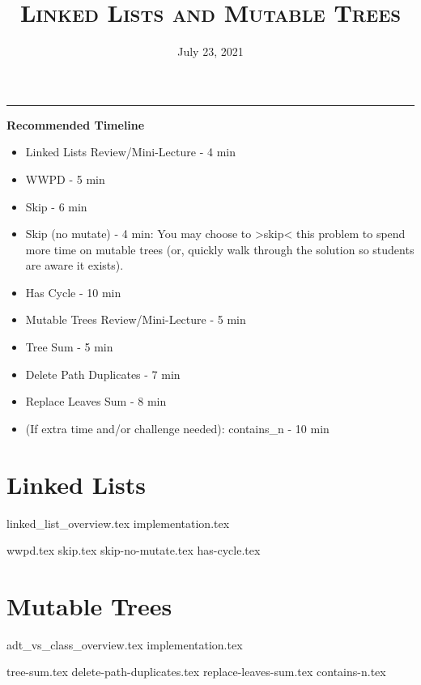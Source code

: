 \documentclass{exam}
\title{\textsc{Linked Lists and Mutable Trees}}
\date{July 23, 2021}
\begin{document}
\maketitle
\rule{\textwidth}{0.15em}
\fontsize{12}{15}\selectfont

\begin{guide}
\textbf{Recommended Timeline}
\begin{itemize}
    \item Linked Lists Review/Mini-Lecture - 4 min
    \item WWPD - 5 min
    \item Skip - 6 min
    \item Skip (no mutate) - 4 min: You may choose to >skip< this problem to spend more time on mutable trees (or, quickly walk through the solution so students are aware it exists).
    \item Has Cycle - 10 min
    \item Mutable Trees Review/Mini-Lecture - 5 min
    \item Tree Sum - 5 min
    \item Delete Path Duplicates - 7 min
    \item Replace Leaves Sum - 8 min
    \item (If extra time and/or challenge needed): contains\_n - 10 min
\end{itemize}
\end{guide}

\section{Linked Lists}
{linked_list_overview.tex}
{implementation.tex}
\newpage
\begin{questions}
{wwpd.tex}
\newpage
{skip.tex}
{skip-no-mutate.tex}
{has-cycle.tex}
\end{questions}

\newpage
\section{Mutable Trees}
{adt_vs_class_overview.tex}
{implementation.tex}
\begin{questions}
    {tree-sum.tex}
    \newpage
    {delete-path-duplicates.tex}
    {replace-leaves-sum.tex}
    {contains-n.tex}
\end{questions}
\end{document}
